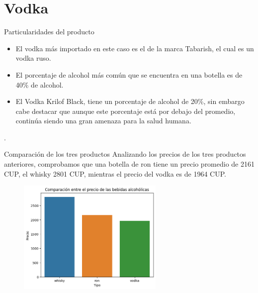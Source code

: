 \documentclass{beamer}
\begin{document}
\section{Vodka}
    \begin{frame}{Particularidades del producto}
         \begin{itemize}
             \item El vodka más importado en este caso es el de la marca Tabarish, el cual es un vodka ruso.
             \item  El porcentaje de alcohol más común que se encuentra en una botella es de 40\% de alcohol.
             \item El Vodka Krilof Black, tiene un porcentaje de alcohol de  20\%, sin embargo cabe destacar que aunque este porcentaje está  por debajo del promedio, continúa siendo una gran amenaza para la salud humana.
         \end{itemize}.

    \end{frame}
    \begin{frame}{Comparación de los tres productos}
       \small Analizando los precios de los tres productos anteriores, comprobamos que una botella de ron tiene un precio promedio de 2161 CUP, el whisky 2801 CUP, mientras el precio del vodka es de 1964 CUP.

        \begin{figure}[h]
       	\centering
       	\includegraphics[width=7cm]{comparation.png}
       \end{figure}

    \end{frame}
\end{document}

